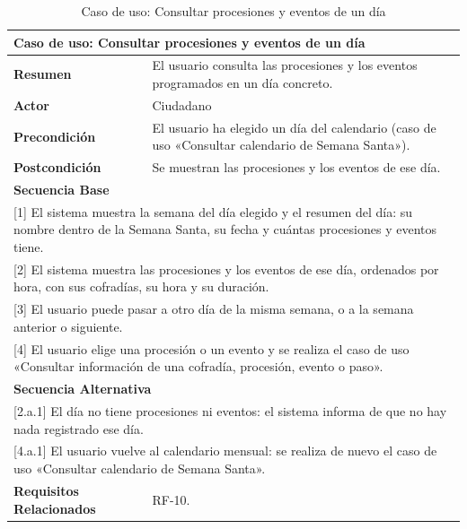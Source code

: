 \begin{table}[h!]
    \centering
    \renewcommand{\arraystretch}{1.5}

    \begin{tabular}{|p{4cm}|p{11cm}|}
        \hline
        \multicolumn{2}{|l|}{\textbf{Caso de uso: Consultar procesiones y eventos de un día}} \\
        \hline
        \textbf{Resumen} & El usuario consulta las procesiones y los eventos programados en un día concreto. \\
        \hline
        \textbf{Actor} & Ciudadano \\
        \hline
        \textbf{Precondición} & El usuario ha elegido un día del calendario (caso de uso «Consultar calendario de Semana Santa»). \\
        \hline
        \textbf{Postcondición} & Se muestran las procesiones y los eventos de ese día. \\
        \hline
        \multicolumn{2}{|l|}{\textbf{Secuencia Base}} \\
        \hline
        \multicolumn{2}{|p{15cm}|}{ [1] El sistema muestra la semana del día elegido y el resumen del día: su nombre dentro de la Semana Santa, su fecha y cuántas procesiones y eventos tiene. } \\
        \hline
        \multicolumn{2}{|p{15cm}|}{ [2] El sistema muestra las procesiones y los eventos de ese día, ordenados por hora, con sus cofradías, su hora y su duración. } \\
        \hline
        \multicolumn{2}{|p{15cm}|}{ [3] El usuario puede pasar a otro día de la misma semana, o a la semana anterior o siguiente. } \\
        \hline
        \multicolumn{2}{|p{15cm}|}{ [4] El usuario elige una procesión o un evento y se realiza el caso de uso «Consultar información de una cofradía, procesión, evento o paso». } \\
        \hline
        \multicolumn{2}{|l|}{\textbf{Secuencia Alternativa}} \\
        \hline
        \multicolumn{2}{|p{15cm}|}{ [2.a.1] El día no tiene procesiones ni eventos: el sistema informa de que no hay nada registrado ese día. } \\
        \hline
        \multicolumn{2}{|p{15cm}|}{ [4.a.1] El usuario vuelve al calendario mensual: se realiza de nuevo el caso de uso «Consultar calendario de Semana Santa». } \\
        \hline
        \textbf{Requisitos Relacionados} & RF-10. \\
        \hline
    \end{tabular}
    \caption{Caso de uso: Consultar procesiones y eventos de un día}
\end{table}

